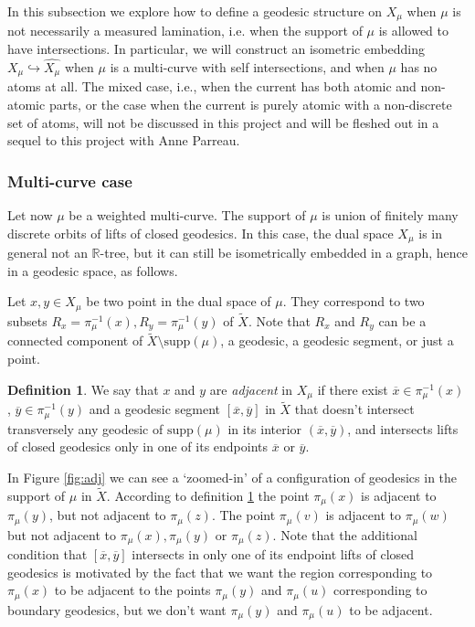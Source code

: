 \documentclass[12pt,article]{amsart}
\numberwithin{equation}{section}
\numberwithin{figure}{section}
\theoremstyle{definition}
\newtheorem{definition}[equation]{Definition}
\theoremstyle{plain}
\newcommand\R{\ensuremath{\mathbb{R}}}
\newcommand*{\wt}[1]{\widetilde{#1}}
\begin{document}
  In this subsection we explore how to define a geodesic structure on $X_\mu$ when $\mu$ is not necessarily a measured lamination, i.e. when the support of $\mu$ is allowed to have intersections. In particular, we will construct an isometric embedding $X_\mu \hookrightarrow \widehat{X_\mu}$ when $\mu$ is a multi-curve with self intersections, and when $\mu$ has no atoms at all. The mixed case, i.e., when the current has both atomic and non-atomic parts, or the case when the current is purely atomic with a non-discrete set of atoms, will not be discussed in this project and will be fleshed out in a sequel to this project with Anne Parreau.

 
\subsubsection{Multi-curve case}


Let now $\mu$ be a weighted multi-curve. The support of $\mu$ is union of finitely many discrete orbits of lifts of closed geodesics. In this case, the dual space $X_\mu$ is in general not an $\R$-tree, but it can still be isometrically embedded in a graph, hence in a geodesic space, as follows.
 
 Let $x , y \in X_\mu$ be two point in the dual space of $\mu$. They correspond to two subsets $R_x=\pi_{\mu}^{-1}(x) , R_y=\pi_{\mu}^{-1}(y)$ of $\wt{X}$. Note that $R_x$ and $R_y$ can be a connected component of $\wt{X} \setminus \mathrm{supp}(\mu)$, a geodesic, a geodesic segment, or just a point.
 
 \begin{definition}
 \label{def:adjacent}
 We say that $x$ and $y$ are \emph{adjacent} in $X_\mu$ if there exist $\overline{x} \in\pi_{\mu}^{-1}(x)$, $\overline{y} \in \pi_{\mu}^{-1}(y)$ and a geodesic segment $[\overline{x}, \overline{y}]$ in $\wt{X}$ that doesn't intersect transversely any geodesic of $\mathrm{supp}(\mu)$ in its interior $(\overline{x}, \overline{y})$, and intersects lifts of closed geodesics only in one of its endpoints $\overline{x}$ or $\overline{y}$.
 \end{definition}
 

 In Figure \ref{fig:adj} we can see a `zoomed-in' of a configuration of geodesics in the support of $\mu$ in $\wt{X}$. According to definition \ref{def:adjacent} the point $\pi_\mu (x)$ is adjacent to $\pi_\mu (y)$, but not adjacent to $\pi_\mu (z)$. The point $\pi_\mu (v)$ is adjacent to $\pi_\mu (w)$ but not adjacent to $\pi_\mu (x), \pi_\mu (y)$ or $\pi_\mu (z)$.  Note that the additional condition that $[\overline{x}, \overline{y}]$ intersects in only one of its endpoint lifts of closed geodesics is motivated by the fact that we want the region corresponding to $\pi_\mu (x)$ to be adjacent to the points $\pi_\mu (y)$ and $\pi_\mu (u)$ corresponding to boundary  geodesics, but we don't want $\pi_\mu (y)$ and $\pi_\mu (u)$ to be adjacent.
\end{document}
